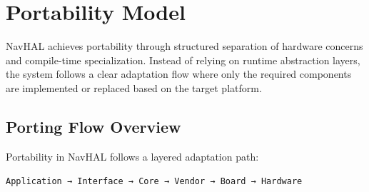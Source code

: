\section{Portability Model}
\label{sec:navhal_portability_model}

NavHAL achieves portability through structured separation of hardware concerns and compile-time specialization. Instead of relying on runtime abstraction layers, the system follows a clear adaptation flow where only the required components are implemented or replaced based on the target platform.

\subsection*{Porting Flow Overview}

Portability in NavHAL follows a layered adaptation path:

\begin{center}
\texttt{Application → Interface → Core → Vendor → Board → Hardware}
\end{center}


